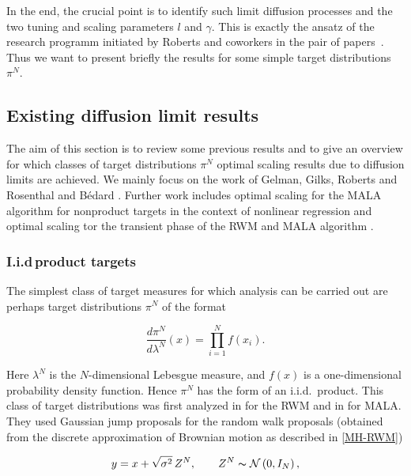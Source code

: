 In the end, the crucial point is to identify such limit diffusion processes and the two tuning and scaling parameters $l$ and $\gamma$. This is exactly the ansatz of the research programm initiated by Roberts and coworkers in the pair of papers~\autocite{Roberts1997, Roberts2001}. Thus we want to present briefly the results for some simple target distributions $ \pi^{N} $.


\subsection{Existing diffusion limit results}
\label{CC:Existing results}

The aim of this section is to review some previous results and to give an overview for which classes of target distributions $\pi^{N}$ optimal scaling results due to diffusion limits are achieved. We mainly focus on the work of  Gelman, Gilks, Roberts and Rosenthal and B\'{e}dard \autocite{Bedard2007, Roberts1997, Roberts2001, Roberts1998}. Further work includes optimal scaling for the MALA algorithm for nonproduct targets in the context of nonlinear regression \autocite{breyer2004} and optimal scaling tor the transient phase of the RWM and MALA algorithm \autocite{Christensen2003, Jourdain2013}.

\subsubsection{I.i.d\,product targets} 

The simplest class of target measures for which analysis can be carried out are perhaps target distributions $ \pi^{N} $ of the format

\begin{equation}
 \label{CC:iid product targets}
 \frac{d \pi^{N}}{d \lambda^{N}}(x) = \prod_{i=1}^{N} f(x_i).
\end{equation}

Here $ \lambda^{N} $ is the $N$-dimensional Lebesgue measure, and $f(x)$ is a one-dimensional probability density function. Hence $\pi^{N}$ has the form of an i.i.d.~product. This class of target distributions was first analyzed in \autocite{Roberts1997} for the RWM and in \autocite{Roberts1998} for MALA.
They used Gaussian jump proposals for the random walk proposals (obtained from the discrete approximation of Brownian motion as described in \ref{MH-RWM})

\begin{equation}
 \label{CC:RWMPoposals}
 y = x + \sqrt{\sigma^2}\,Z^{N}, \qquad Z^{N} \thicksim \mathcal{N}\left( 0,I_N \right),
\end{equation}


